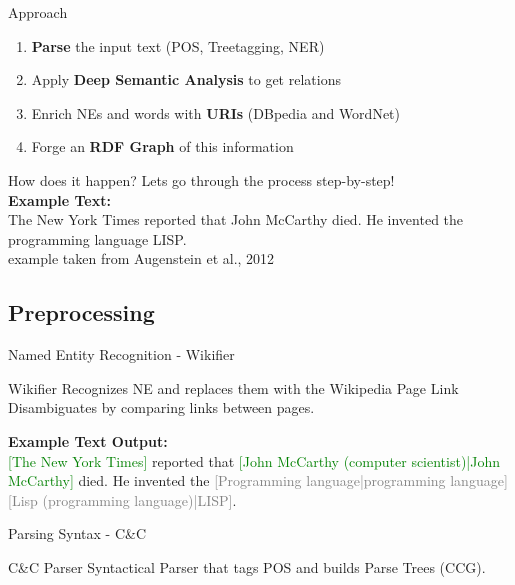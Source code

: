 \documentclass[11pt]{beamer}
\begin{document}
		\begin{frame}{Approach}
			\begin{enumerate}
				\item \textbf{Parse} the input text (POS, Treetagging, NER)
				\item Apply \textbf{Deep Semantic Analysis} to get relations
				\item Enrich NEs and words with \textbf{URIs} (DBpedia and WordNet)
				\item Forge an \textbf{RDF Graph} of this information
			\end{enumerate}					
		\end{frame}
		
		\begin{frame}{How does it happen?}
			Lets go through the process step-by-step!\\
			\vspace{15pt}
			\textbf{Example Text:}\\
			The New York Times reported that John McCarthy died. He invented the programming language LISP.\\
			\tiny{example taken from Augenstein et al., 2012}			
		\end{frame}
	\subsection{Preprocessing}
		\begin{frame}{Named Entity Recognition - Wikifier}
			\begin{block}{Wikifier}
				Recognizes NE and replaces them with the Wikipedia Page Link\\
				Disambiguates by comparing links between pages.
			\end{block}
			\vspace{15pt}
			\textbf{Example Text Output:}\\
			\textcolor{green}{[The New York Times]} reported that \textcolor{green}{[John McCarthy (computer scientist)|John McCarthy]} died. He invented the \textcolor{gray}{[Programming language|programming language]} \textcolor{gray}{[Lisp (programming language)|LISP]}.
		\end{frame}
		
		\begin{frame}{Parsing Syntax - C\&C}
			\begin{block}{C\&C Parser}
				Syntactical Parser that tags POS and builds Parse Trees (CCG).
			\end{block}
		\end{frame}
		
\end{document}
